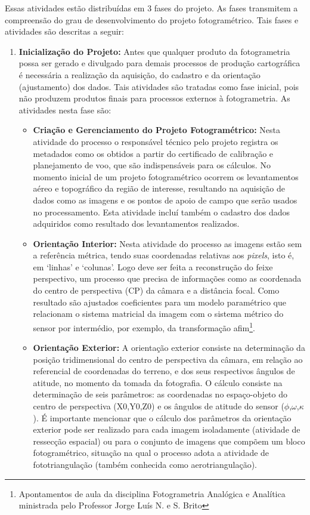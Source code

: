 Essas atividades estão distribuídas em 3 fases do projeto. As fases transmitem a compreensão do grau de desenvolvimento do projeto fotogramétrico. Tais fases e atividades são descritas a seguir:

\begin{enumerate}
    \item \textbf{Inicialização do Projeto:} Antes que qualquer produto da fotogrametria possa ser gerado e divulgado para demais processos de produção cartográfica é necessária a realização da aquisição, do cadastro e da orientação (ajustamento) dos dados. Tais atividades são tratadas como fase inicial, pois não produzem produtos finais para processos externos à fotogrametria. As atividades nesta fase são:
    \begin{itemize}
        \item \textbf{Criação e Gerenciamento do Projeto Fotogramétrico:} Nesta atividade do processo o responsável técnico pelo projeto registra os metadados como os obtidos a partir do certificado de calibração e planejamento de voo, que são indispensáveis para os cálculos. No momento inicial de um projeto fotogramétrico ocorrem os levantamentos aéreo e topográfico da região de interesse, resultando na aquisição de dados como as imagens e os pontos de apoio de campo que serão usados no processamento. Esta atividade incluí também o cadastro dos dados adquiridos como resultado dos levantamentos realizados.
        \item \textbf{Orientação Interior:} Nesta atividade do processo as imagens estão sem a referência métrica, tendo suas coordenadas relativas aos \textit{pixels}, isto é, em `linhas' e `colunas'. Logo deve ser feita a reconstrução do feixe perspectivo, um processo que precisa de informações como as coordenada do centro de perspectiva (CP) da câmara e a distância focal. Como resultado são ajustados coeficientes para um modelo paramétrico que relacionam o sistema matricial da imagem com o sistema métrico do sensor por intermédio, por exemplo, da transformação afim\footnote{Apontamentos de aula da disciplina Fotogrametria Analógica e Analítica ministrada pelo Professor Jorge Luís N. e S. Brito}.
        \item \textbf{Orientação Exterior:} A orientação exterior consiste na determinação da posição tridimensional do centro de perspectiva da câmara, em relação ao referencial de coordenadas do terreno, e dos seus respectivos ângulos de atitude, no momento da tomada da fotografia. O cálculo consiste na determinação de seis parâmetros: as coordenadas no espaço-objeto do centro de perspectiva (X0,Y0,Z0) e os ângulos de atitude do sensor ($\phi$,$\omega$,$\kappa$). É importante mencionar que o cálculo dos parâmetros da orientação exterior pode ser realizado para cada imagem isoladamente (atividade de ressecção espacial) ou para o conjunto de imagens que compõem um bloco fotogramétrico, situação na qual o processo adota a atividade de fototriangulação (também conhecida como aerotriangulação).

\end{itemize}
\end{enumerate}
